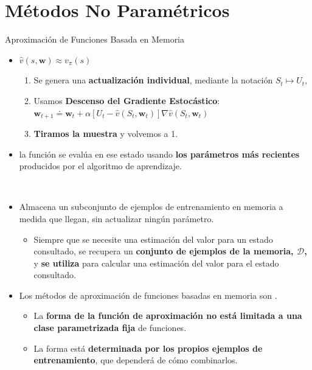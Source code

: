 \documentclass[10pt, envcountsect, handout, aspectratio=1610, hyperref={hypertexnames=true}]{beamer}
\begin{document}

\section{Métodos No Paramétricos}


	\begin{frame}{Aproximación de Funciones Basada en Memoria}
		\begin{itemize}
			\item {} $\hat{v}(s, \mathbf{w}) \approx v_\pi(s)$
				\begin{enumerate}
					\item Se genera una \textbf{actualización individual}, mediante la notación $S_t \mapsto U_t$,
					\item Usamos \textbf{Descenso del Gradiente Estocástico}: 
					$
					\mathbf{w}_{t+1} \doteq \mathbf{w}_t + \alpha \left[ U_t - \hat{v}(S_t, \mathbf{w}_t) \right] \nabla \hat{v}(S_t, \mathbf{w}_t)
					$
					\item \textbf{Tiramos la muestra} y volvemos a 1.
				\end{enumerate}
				
			\item[]	  la función se evalúa en ese estado usando \textbf{los parámetros más recientes} producidos por el algoritmo de aprendizaje.
			

			~
				
			\item {} Almacena un subconjunto de ejemplos de entrenamiento en memoria a medida que llegan, sin actualizar ningún parámetro.
			\begin{itemize}
				\item Siempre que se necesite una estimación del valor para un estado consultado, se recupera un \textbf{conjunto de ejemplos de la memoria, \( \mathcal{D} \),} y \textbf{se utiliza} para calcular una estimación del valor para el estado consultado.
			\end{itemize}
			
			\item Los métodos de aproximación de funciones basadas en memoria son .
			\begin{itemize}
				\item La \textbf{forma de la función de aproximación no está limitada a una clase parametrizada fija} de funciones.
				\item La forma está \textbf{determinada por los propios ejemplos de entrenamiento}, que dependerá de cómo combinarlos.
			

\end{itemize}
\end{itemize}
\end{frame}
\end{document}
